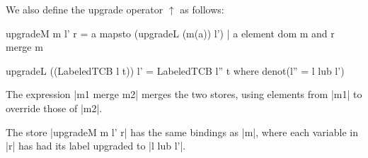 We also define the upgrade operator $\uparrow$ as follows:
\begin{code}
upgradeM m l' r = { a mapsto (upgradeL (m(a)) l') | a element dom m and r} merge m
\end{code}
\begin{code}
  upgradeL ((LabeledTCB l t)) l' = LabeledTCB l'' t where denot(l'' = l lub l')
\end{code}

The expression |m1 merge m2| merges the two stores, using elements
from |m1| to override those of |m2|.

The store |upgradeM m l' r|  has the same bindings as |m|, where each
variable in |r| has had its label upgraded to |l lub l'|.


%
%


